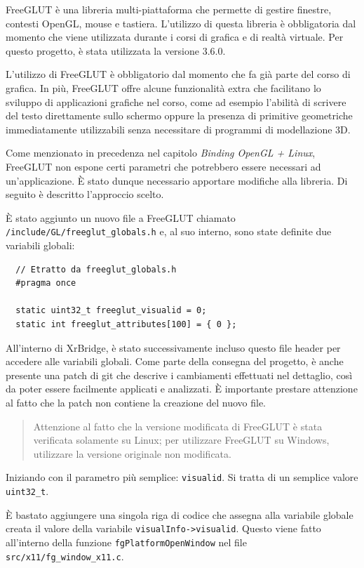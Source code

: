\documentclass[twoside]{supsistudent}
\begin{document}
FreeGLUT è una libreria multi-piattaforma che permette di gestire finestre, contesti OpenGL, mouse e tastiera. L'utilizzo di questa libreria è obbligatoria dal momento che viene utilizzata durante i corsi di grafica e di realtà virtuale. Per questo progetto, è stata utilizzata la versione 3.6.0.

L'utilizzo di FreeGLUT è obbligatorio dal momento che fa già parte del corso di grafica. In più, FreeGLUT offre alcune funzionalità extra che facilitano lo sviluppo di applicazioni grafiche nel corso, come ad esempio l'abilità di scrivere del testo direttamente sullo schermo oppure la presenza di primitive geometriche immediatamente utilizzabili senza necessitare di programmi di modellazione 3D.

Come menzionato in precedenza nel capitolo \textit{Binding OpenGL + Linux}, FreeGLUT non espone certi parametri che potrebbero essere necessari ad un'applicazione. È stato dunque necessario apportare modifiche alla libreria. Di seguito è descritto l'approccio scelto.

È stato aggiunto un nuovo file a FreeGLUT chiamato \texttt{/include/GL/freeglut\_globals.h} e, al suo interno, sono state definite due variabili globali:

\begin{verbatim}
  // Etratto da freeglut_globals.h
  #pragma once

  static uint32_t freeglut_visualid = 0;
  static int freeglut_attributes[100] = { 0 };
\end{verbatim}

All'interno di XrBridge, è stato successivamente incluso questo file header per accedere alle variabili globali. Come parte della consegna del progetto, è anche presente una patch di git che descrive i cambiamenti effettuati nel dettaglio, così da poter essere facilmente applicati e analizzati. È importante prestare attenzione al fatto che la patch non contiene la creazione del nuovo file.

\begin{quote}
  Attenzione al fatto che la versione modificata di FreeGLUT è stata verificata solamente su Linux; per utilizzare FreeGLUT su Windows, utilizzare la versione originale non modificata.
\end{quote}

Iniziando con il parametro più semplice: \texttt{visualid}. Si tratta di un semplice valore \texttt{uint32\_t}.

È bastato aggiungere una singola riga di codice che assegna alla variabile globale creata il valore della variabile \texttt{visualInfo->visualid}. Questo viene fatto all'interno della funzione \texttt{fgPlatformOpenWindow} nel file \texttt{src/x11/fg\_window\_x11.c}.
\end{document}
